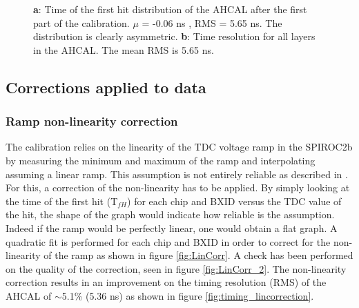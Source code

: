 \begin{figure}[htbp]
	\hfill
	\hfill
\caption[]{\textbf{a}: Time of the first hit distribution of the AHCAL after the first part of the calibration. $\mu$ = -0.06 ns , RMS = 5.65 ns. The distribution is clearly asymmetric. \textbf{b}: Time resolution for all layers in the AHCAL. The mean RMS is 5.65 ns.}
\end{figure}

\subsection{Corrections applied to data}
\subsubsection{Ramp non-linearity correction}
\label{subsec:lin_corr}

The calibration relies on the linearity of the TDC voltage ramp in the SPIROC2b by measuring the minimum and maximum of the ramp and interpolating assuming a linear ramp. This assumption is not entirely reliable as described in \cite{OskarSSP, EldwanSSP}. For this, a correction of the non-linearity has to be applied. By simply looking at the time of the first hit (T$_{fH}$) for each chip and BXID versus the TDC value of the hit, the shape of the graph would indicate how reliable is the assumption. Indeed if the ramp would be perfectly linear, one would obtain a flat graph. A quadratic fit is performed for each chip and BXID in order to correct for the non-linearity of the ramp as shown in figure \ref{fig:LinCorr}. A check has been performed on the quality of the correction, seen in figure \ref{fig:LinCorr_2}. The non-linearity correction results in an improvement on the timing resolution (RMS) of the AHCAL of $\sim$5.1\% (5.36 ns) as shown in figure \ref{fig:timing_lincorrection}.

